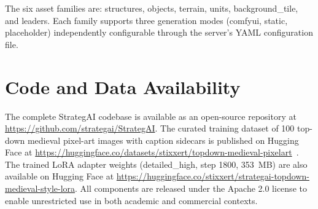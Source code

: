 \documentclass[conference]{IEEEtran}
\begin{document}
The six asset families are: structures, objects, terrain, units, background\_tile, and leaders. Each family supports three generation modes (comfyui, static, placeholder) independently configurable through the server's YAML configuration file.

\section{Code and Data Availability}
\label{app:code}

The complete StrategAI codebase is available as an open-source repository at \url{https://github.com/strategai/StrategAI}. The curated training dataset of 100 top-down medieval pixel-art images with caption sidecars is published on Hugging Face at \url{https://huggingface.co/datasets/stixxert/topdown-medieval-pixelart}~\cite{stixxert2024dataset}. The trained LoRA adapter weights (detailed\_high, step 1800, 353~MB) are also available on Hugging Face at \url{https://huggingface.co/stixxert/strategai-topdown-medieval-style-lora}. All components are released under the Apache 2.0 license to enable unrestricted use in both academic and commercial contexts.
\end{document}
